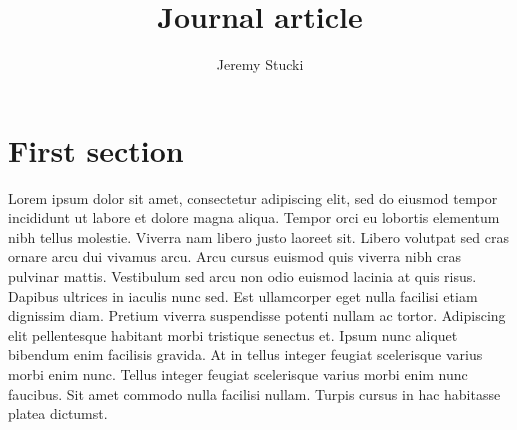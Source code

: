 \documentclass[twocolumn,a4paper]{journal}
\title{Journal article}
\author{Jeremy Stucki}
\begin{document}
\maketitle

\section{First section}
Lorem ipsum dolor sit amet, consectetur adipiscing elit, sed do eiusmod tempor incididunt ut labore et dolore magna aliqua. Tempor orci eu lobortis elementum nibh tellus molestie. Viverra nam libero justo laoreet sit. Libero volutpat sed cras ornare arcu dui vivamus arcu. Arcu cursus euismod quis viverra nibh cras pulvinar mattis. Vestibulum sed arcu non odio euismod lacinia at quis risus. Dapibus ultrices in iaculis nunc sed. Est ullamcorper eget nulla facilisi etiam dignissim diam. Pretium viverra suspendisse potenti nullam ac tortor. Adipiscing elit pellentesque habitant morbi tristique senectus et. Ipsum nunc aliquet bibendum enim facilisis gravida. At in tellus integer feugiat scelerisque varius morbi enim nunc. Tellus integer feugiat scelerisque varius morbi enim nunc faucibus. Sit amet commodo nulla facilisi nullam. Turpis cursus in hac habitasse platea dictumst.
\end{document}
